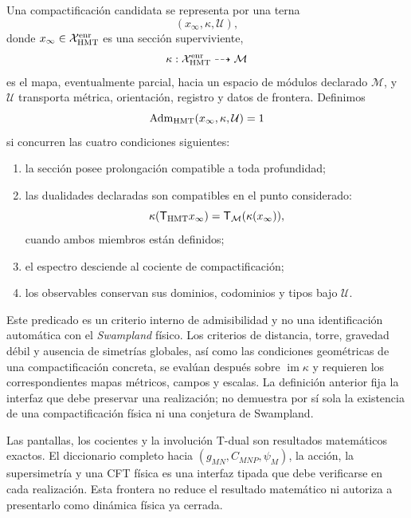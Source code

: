 \begin{definition}
\label{def:admisibilidad-compactificacion-hmt-rev3}
Una compactificación candidata se representa por una terna
\[
 (x_\infty,\kappa,\mathcal U),
\]
donde \(x_\infty\in\mathcal X_{\rm HMT}^{\rm enr}\) es una sección
superviviente,
\[
 \kappa:\mathcal X_{\rm HMT}^{\rm enr}\dashrightarrow\mathcal M
\]
es el mapa, eventualmente parcial, hacia un espacio de módulos declarado
\(\mathcal M\), y
\(\mathcal U\) transporta métrica, orientación, registro y datos de frontera.
Definimos
\[
 \operatorname{Adm}_{\rm HMT}(x_\infty,\kappa,\mathcal U)=1
\]
si concurren las cuatro condiciones siguientes:
\begin{enumerate}
 \item la sección posee prolongación compatible a toda profundidad;
 \item las dualidades declaradas son compatibles en el punto considerado:
       \[
        \kappa(\mathsf T_{\rm HMT}x_\infty)
        =\mathsf T_{\mathcal M}(\kappa(x_\infty)),
       \]
       cuando ambos miembros están definidos;
 \item el espectro desciende al cociente de compactificación;
 \item los observables conservan sus dominios, codominios y tipos bajo
       \(\mathcal U\).
\end{enumerate}
\end{definition}

Este predicado es un criterio interno de admisibilidad y no una
identificación automática con el \emph{Swampland} físico. Los criterios de
distancia, torre, gravedad débil y ausencia de simetrías globales, así como
las condiciones geométricas de una compactificación concreta, se evalúan
después sobre \(\operatorname{im}\kappa\) y requieren los correspondientes
mapas métricos, campos y escalas. La definición anterior fija la interfaz que
debe preservar una realización; no demuestra por sí sola la existencia de
una compactificación física ni una conjetura de Swampland.

\begin{statusbox}[title={Estatuto de la interfaz}]
Las pantallas, los cocientes y la involución T-dual son resultados
matemáticos exactos. El diccionario completo hacia
\((g_{MN},C_{MNP},\psi_M)\), la acción, la supersimetría y una CFT física es
una interfaz tipada que debe verificarse en cada realización. Esta frontera
no reduce el resultado matemático ni autoriza a presentarlo como dinámica
física ya cerrada.
\end{statusbox}
